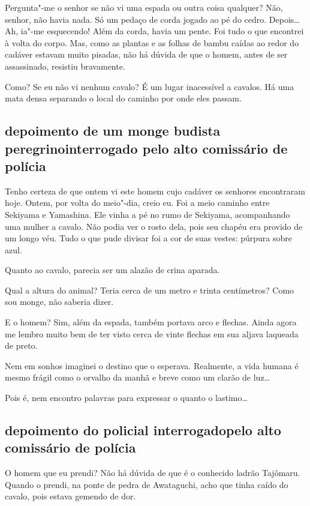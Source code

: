 Pergunta"-me o senhor se não vi uma espada ou outra coisa qualquer? Não,
senhor, não havia nada. Só um pedaço de corda jogado ao pé do cedro.
Depois\ldots{} Ah, ia"-me esquecendo! Além da corda, havia um pente. Foi tudo
o que encontrei à volta do corpo. Mas, como as plantas e as folhas de
bambu caídas ao redor do cadáver estavam muito pisadas, não há dúvida
de que o homem, antes de ser assassinado, resistiu bravamente. 

Como? Se eu não vi nenhum cavalo? É um lugar inacessível a cavalos. Há
uma mata densa separando o local do caminho por onde eles passam.

\subsection*{depoimento de um monge budista peregrino\break interrogado pelo alto
comissário de polícia}

Tenho certeza de que ontem vi este homem cujo cadáver os senhores
encontraram hoje. Ontem, por volta do meio"-dia, creio eu. Foi a meio
caminho entre Sekiyama e Yamashina. Ele vinha a pé no rumo de Sekiyama,
acompanhando uma mulher a cavalo. Não podia ver o rosto dela, pois seu
chapéu era provido de um longo véu. Tudo o que pude divisar foi a cor
de suas vestes: púrpura sobre azul. 

Quanto ao cavalo, parecia ser um alazão de crina aparada.

Qual a altura do animal? Teria cerca de um metro e trinta centímetros?
Como sou monge, não saberia dizer.

E o homem? Sim, além da espada, também portava arco e flechas. Ainda
agora me lembro muito bem de ter visto cerca de vinte flechas em sua
aljava laqueada de preto.

Nem em sonhos imaginei o destino que o esperava. Realmente, a vida
humana é mesmo frágil como o orvalho da manhã e breve como um clarão de
luz\ldots{} 

Pois é, nem encontro palavras para expressar o quanto o lastimo\ldots{}

\subsection*{depoimento do policial interrogado\break pelo alto comissário de polícia}

O homem que eu prendi? Não há dúvida de que é o conhecido ladrão
Tajômaru. Quando o prendi, na ponte de pedra de Awataguchi, acho que
tinha caído do cavalo, pois estava gemendo de dor.

